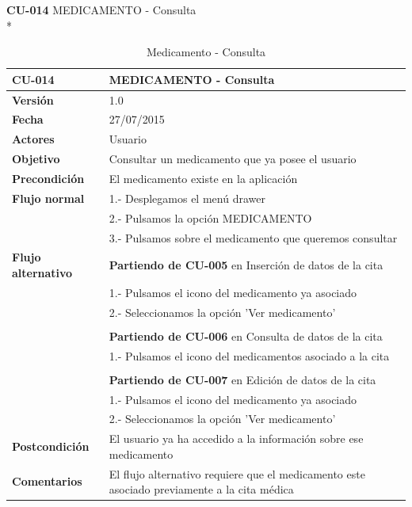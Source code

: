 \documentclass[../pfc.tex]{subfiles}
\begin{document}
		\clearpage
		
		\textbf{CU-014}	MEDICAMENTO - Consulta\\*
		
		\begin{table}[H]
			\centering
			\begin{tabular}[t]{|p{3cm}|p{9.5cm}|}
				\hline \textbf{CU-014} & \textbf{MEDICAMENTO - Consulta} \\*
				\hline\hline \textbf{Versión} & 1.0 \\*
				\hline\hline \textbf{Fecha} & 27/07/2015 \\*
				\hline\textbf{Actores} 	& Usuario\\*
				\hline \textbf{Objetivo} & Consultar un medicamento que ya posee el usuario\\* 			
				\hline \textbf{Precondición} & El medicamento existe en la aplicación\\* 
				\hline \textbf{Flujo normal} & 1.- Desplegamos el menú drawer \\* 
				& 2.- Pulsamos la opción MEDICAMENTO\\*	
				& 3.- Pulsamos sobre el medicamento que queremos consultar\\*	
				\hline \textbf{Flujo alternativo} & \textbf{Partiendo de CU-005} en Inserción de datos de la cita\\* 
				& 1.- Pulsamos el icono del medicamento ya asociado\\*	
				& 2.- Seleccionamos la opción 'Ver medicamento'\\*
				& \\*
				& \textbf{Partiendo de CU-006} en Consulta de datos de la cita\\* 
				& 1.- Pulsamos el icono del medicamentos asociado a la cita\\*	
				& \\*
				& \textbf{Partiendo de CU-007} en Edición de datos de la cita\\* 
				& 1.- Pulsamos el icono del medicamento ya asociado\\*	
				& 2.- Seleccionamos la opción 'Ver medicamento'\\*
				\hline \textbf{Postcondición} & El usuario ya ha accedido a la información sobre ese medicamento \\* 
				\hline \textbf{Comentarios}   & El flujo alternativo requiere que el medicamento este asociado previamente a la cita médica\\*
				\hline
			\end{tabular}
			\caption{Medicamento - Consulta}
			\label{tabla:caso014}
		\end{table}
		
\end{document}
